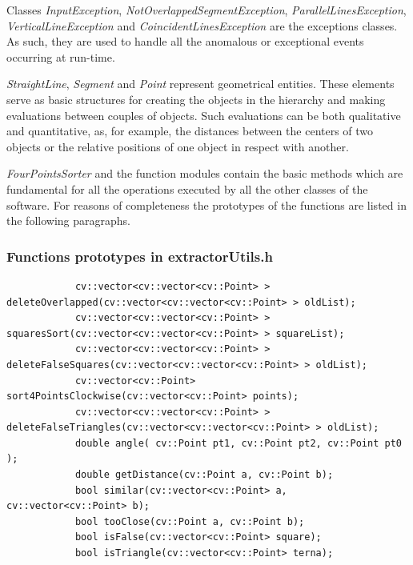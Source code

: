 		Classes \emph{InputException}, \emph{NotOverlappedSegmentException}, \emph{ParallelLinesException}, \emph{VerticalLineException} and \emph{CoincidentLinesException} are the exceptions classes. 
		As such, they are used to handle all the anomalous or exceptional events occurring at run-time.	
	
		\emph{StraightLine}, \emph{Segment} and \emph{Point} represent geometrical entities. These elements serve as basic structures for creating the objects in the hierarchy and making evaluations between couples of objects.
		Such evaluations can be both qualitative and quantitative, as, for example, the distances between the centers of two objects or the relative positions of one object in respect with another.
		
		\emph{FourPointsSorter} and the function modules contain the basic methods which are fundamental for all the operations executed by all the other classes of the software.
		For reasons of completeness the prototypes of the functions are listed in the following paragraphs.

			\subsubsection{Functions prototypes in extractorUtils.h}
			\begin{lstlisting}
			cv::vector<cv::vector<cv::Point> > deleteOverlapped(cv::vector<cv::vector<cv::Point> > oldList);
			cv::vector<cv::vector<cv::Point> > squaresSort(cv::vector<cv::vector<cv::Point> > squareList);
			cv::vector<cv::vector<cv::Point> > deleteFalseSquares(cv::vector<cv::vector<cv::Point> > oldList);
			cv::vector<cv::Point> sort4PointsClockwise(cv::vector<cv::Point> points);
			cv::vector<cv::vector<cv::Point> > deleteFalseTriangles(cv::vector<cv::vector<cv::Point> > oldList);
			double angle( cv::Point pt1, cv::Point pt2, cv::Point pt0 );
			double getDistance(cv::Point a, cv::Point b);
			bool similar(cv::vector<cv::Point> a, cv::vector<cv::Point> b);
			bool tooClose(cv::Point a, cv::Point b);
			bool isFalse(cv::vector<cv::Point> square);
			bool isTriangle(cv::vector<cv::Point> terna);
			
			\end{lstlisting}

